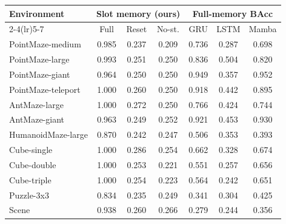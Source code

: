 \begin{tabular}{lcccccc}
\toprule
\multirow{2}{*}{Environment} & \multicolumn{3}{c}{Slot memory (ours)} & \multicolumn{3}{c}{Full-memory BAcc}\\
\cmidrule(lr){2-4}\cmidrule(lr){5-7}
 & Full & Reset & No-st. & GRU & LSTM & Mamba\\
\midrule
PointMaze-medium & 0.985 & 0.237 & 0.209 & 0.736 & 0.287 & 0.698\\
PointMaze-large & 0.993 & 0.251 & 0.250 & 0.836 & 0.504 & 0.820\\
PointMaze-giant & 0.964 & 0.250 & 0.250 & 0.949 & 0.357 & 0.952\\
PointMaze-teleport & 1.000 & 0.260 & 0.250 & 0.918 & 0.442 & 0.895\\
AntMaze-large & 1.000 & 0.272 & 0.250 & 0.766 & 0.424 & 0.744\\
AntMaze-giant & 0.963 & 0.249 & 0.252 & 0.921 & 0.453 & 0.930\\
HumanoidMaze-large & 0.870 & 0.242 & 0.247 & 0.506 & 0.353 & 0.393\\
Cube-single & 1.000 & 0.286 & 0.254 & 0.662 & 0.328 & 0.674\\
Cube-double & 1.000 & 0.253 & 0.221 & 0.551 & 0.257 & 0.656\\
Cube-triple & 1.000 & 0.254 & 0.223 & 0.564 & 0.242 & 0.651\\
Puzzle-3x3 & 0.834 & 0.235 & 0.249 & 0.341 & 0.304 & 0.425\\
Scene & 0.938 & 0.260 & 0.266 & 0.279 & 0.244 & 0.356\\
\bottomrule
\end{tabular}
